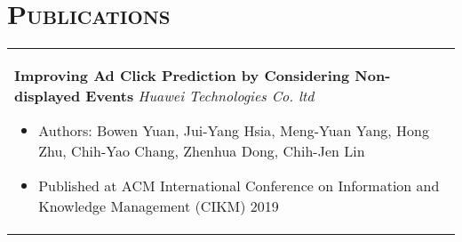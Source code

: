 \documentclass[a4paper,11pt]{article} %
\begin{document}
\section{\Large\bf\textsc{Publications}}
\begin{tabular}{p{18.5cm}}

{\bf{Improving Ad Click Prediction by Considering Non-displayed Events}} \hfill {\it Huawei Technologies Co. ltd}
\begin{itemize}
\item Authors: Bowen Yuan, Jui-Yang Hsia, Meng-Yuan Yang, Hong Zhu, Chih-Yao Chang, Zhenhua Dong, Chih-Jen Lin
\item Published at ACM International Conference on Information and Knowledge Management (CIKM) 2019
\end{itemize} \\
\end{tabular}
\vspace*{-\baselineskip}
\end{document}
